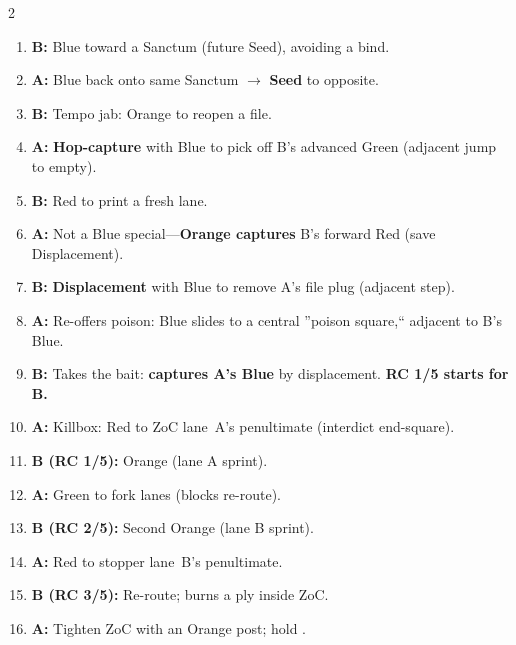 \begin{multicols}{2}
\begin{enumerate}[leftmargin=\textit{,itemsep=0.35em,label=\textbf{M\arabic}:}]
\item \textbf{B:} Blue  toward a Sanctum (future Seed), avoiding a bind.

\item \textbf{A:} Blue  back onto same Sanctum $\to$ \textbf{Seed} to opposite. \RoC\; 

\item \textbf{B:} Tempo jab: Orange  to reopen a file.

\item \textbf{A:} \textbf{Hop-capture} with Blue to pick off B's advanced Green (adjacent jump to empty). \; 

\item \textbf{B:} Red  to print a fresh lane.

\item \textbf{A:} Not a Blue special---\textbf{Orange captures} B's forward Red (save Displacement).

\item \textbf{B:} \textbf{Displacement} with Blue to remove A's file plug (adjacent step). 

\item \textbf{A:} Re-offers poison: Blue slides to a central ''poison square,`` adjacent to B's Blue. 

\item \textbf{B:} Takes the bait: \textbf{captures A's Blue} by displacement. \textbf{RC 1/5 starts for B.}

\item \textbf{A:} Killbox: Red  to ZoC lane~A's penultimate (interdict end-square).

\item \textbf{B (RC 1/5):} Orange  (lane A sprint).

\item \textbf{A:} Green  to fork lanes (blocks re-route).

\item \textbf{B (RC 2/5):} Second Orange  (lane B sprint).

\item \textbf{A:} Red  to stopper lane~B's penultimate.

\item \textbf{B (RC 3/5):} Re-route; burns a ply inside ZoC.

\item \textbf{A:} Tighten ZoC with an Orange post; hold . 


\end{enumerate}
\end{multicols}
